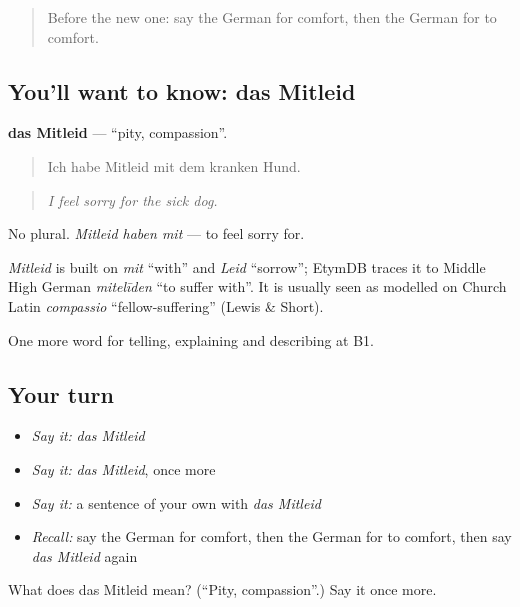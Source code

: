 \label{lesson:GE-C471-mitleid}



\begin{quote}
Before the new one: say the German for comfort, then the German for to comfort.
\end{quote}

\subsection*{You'll want to know: das Mitleid}
\textbf{das Mitleid} — \textquotedblleft{}pity, compassion\textquotedblright{}.

\begin{quote}
Ich habe Mitleid mit dem kranken Hund.
\end{quote}

\begin{quote}
\emph{I feel sorry for the sick dog.}
\end{quote}

No plural. \emph{Mitleid haben mit} — to feel sorry for.

\begin{cousinweb}
\emph{Mitleid} is built on \emph{mit} \textquotedblleft{}with\textquotedblright{} and \emph{Leid} \textquotedblleft{}sorrow\textquotedblright{}; EtymDB traces it to Middle High German \emph{mitelīden} \textquotedblleft{}to suffer with\textquotedblright{}. It is usually seen as modelled on Church Latin \emph{compassio} \textquotedblleft{}fellow-suffering\textquotedblright{} (Lewis \& Short).
\end{cousinweb}

\begin{grammarlens}[title={What you've built}]
One more word for telling, explaining and describing at B1.
\end{grammarlens}

\subsection*{Your turn}
\begin{itemize}
\raggedright
  \item \emph{Say it:} \emph{das Mitleid}
  \item \emph{Say it:} \emph{das Mitleid}, once more
  \item \emph{Say it:} a sentence of your own with \emph{das Mitleid}
  \item \emph{Recall:} say the German for comfort, then the German for to comfort, then say \emph{das Mitleid} again
\end{itemize}

\begin{tcolorbox}[breakable,colback=teal!4,colframe=teal!35!black,title={Before you move on}]
What does das Mitleid mean? (\textquotedblleft{}Pity, compassion\textquotedblright{}.) Say it once more.
\end{tcolorbox}
